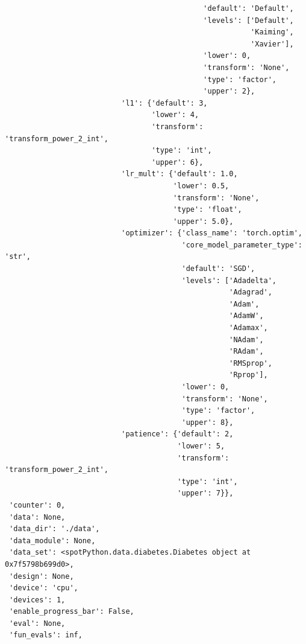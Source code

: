 \documentclass[
  letterpaper,
  DIV=11,
  numbers=noendperiod]{scrreprt}
\begin{document}
\begin{verbatim}
                                              'default': 'Default',
                                              'levels': ['Default',
                                                         'Kaiming',
                                                         'Xavier'],
                                              'lower': 0,
                                              'transform': 'None',
                                              'type': 'factor',
                                              'upper': 2},
                           'l1': {'default': 3,
                                  'lower': 4,
                                  'transform': 'transform_power_2_int',
                                  'type': 'int',
                                  'upper': 6},
                           'lr_mult': {'default': 1.0,
                                       'lower': 0.5,
                                       'transform': 'None',
                                       'type': 'float',
                                       'upper': 5.0},
                           'optimizer': {'class_name': 'torch.optim',
                                         'core_model_parameter_type': 'str',
                                         'default': 'SGD',
                                         'levels': ['Adadelta',
                                                    'Adagrad',
                                                    'Adam',
                                                    'AdamW',
                                                    'Adamax',
                                                    'NAdam',
                                                    'RAdam',
                                                    'RMSprop',
                                                    'Rprop'],
                                         'lower': 0,
                                         'transform': 'None',
                                         'type': 'factor',
                                         'upper': 8},
                           'patience': {'default': 2,
                                        'lower': 5,
                                        'transform': 'transform_power_2_int',
                                        'type': 'int',
                                        'upper': 7}},
 'counter': 0,
 'data': None,
 'data_dir': './data',
 'data_module': None,
 'data_set': <spotPython.data.diabetes.Diabetes object at 0x7f5798b699d0>,
 'design': None,
 'device': 'cpu',
 'devices': 1,
 'enable_progress_bar': False,
 'eval': None,
 'fun_evals': inf,

\end{verbatim}
\end{document}
